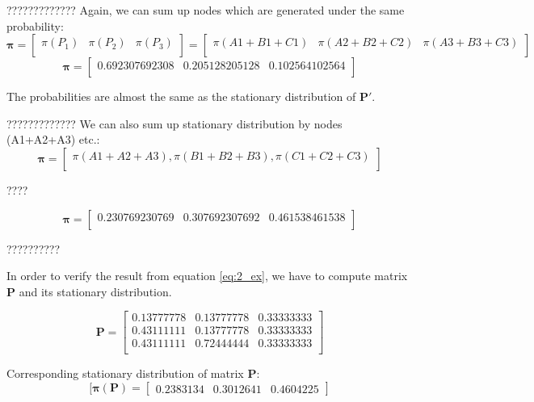 \documentclass{article}
\begin{document}
?????????????
Again, we can sum up nodes which are generated under the same probability:                   
\[\mathbf{\pi} = 
\begin{bmatrix}
\pi(P_1) & \pi(P_2) & \pi(P_3) \\
\end{bmatrix}
= \begin{bmatrix}
\pi(A1+B1+C1) & \pi(A2 + B2+C2) & \pi(A3 + B3 + C3) \\
\end{bmatrix}
\]
\[\mathbf{\pi} = 
\begin{bmatrix}
0.692307692308 & 0.205128205128 & 0.102564102564\\
\end{bmatrix}
\]

The probabilities are almost the same as the stationary distribution of $\mathbf{P'}$.


?????????????
We can also sum up stationary distribution by nodes (A1+A2+A3) etc.:
\[\mathbf{\pi} = 
\begin{bmatrix}
\pi(A1+A2+A3), \pi(B1+B2+B3), \pi(C1+C2+C3) \\
\end{bmatrix}
\]

????

\begin{equation}
\mathbf{\pi} = 
\begin{bmatrix}
0.230769230769 & 0.307692307692 & 0.461538461538 \\
\end{bmatrix}
\label{eq:2_ex}
\end{equation}


??????????

In order to verify the result from equation \ref{eq:2_ex}, we have to compute matrix $\mathbf{P}$ and its stationary distribution.

\[\mathbf{P}=
\begin{bmatrix}
    0.13777778 &  0.13777778 &  0.33333333 \\
    0.43111111 & 0.13777778 & 0.33333333  \\
    0.43111111 & 0.72444444 & 0.33333333 \\
\end{bmatrix}
\]

Corresponding stationary distribution of matrix $\mathbf{P}$:
\begin{equation}
[\mathbf{\pi(P)} = 
\begin{bmatrix}
0.2383134 & 0.3012641 & 0.4604225
\end{bmatrix}
\label{eq:2_ex_v}
\end{equation}
\end{document}
